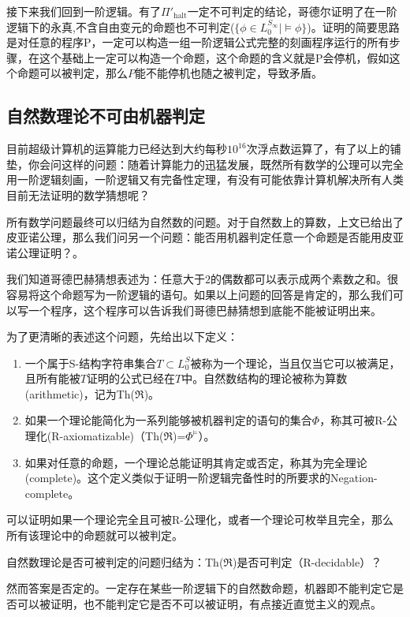      接下来我们回到一阶逻辑。有了$\Pi'_{\text{halt}}$一定不可判定的结论，哥德尔证明了在一阶逻辑下的永真,不含自由变元的命题也不可判定($\{\phi \in L_0^{S_\infty}  | \models \phi \}$)。证明的简要思路是对任意的程序P，一定可以构造一组一阶逻辑公式完整的刻画程序运行的所有步骤，在这个基础上一定可以构造一个命题，这个命题的含义就是P会停机，假如这个命题可以被判定，那么$P$能不能停机也随之被判定，导致矛盾。

\subsection{自然数理论不可由机器判定}

     目前超级计算机的运算能力已经达到大约每秒$10^{16}$次浮点数运算了，有了以上的铺垫，你会问这样的问题：随着计算能力的迅猛发展，既然所有数学的公理可以完全用一阶逻辑刻画，一阶逻辑又有完备性定理，有没有可能依靠计算机解决所有人类目前无法证明的数学猜想呢？

     所有数学问题最终可以归结为自然数的问题。对于自然数上的算数，上文已给出了皮亚诺公理，那么我们问另一个问题：能否用机器判定任意一个命题是否能用皮亚诺公理证明？。


		 我们知道哥德巴赫猜想表述为：任意大于$2$的偶数都可以表示成两个素数之和。很容易将这个命题写为一阶逻辑的语句。如果以上问题的回答是肯定的，那么我们可以写一个程序，这个程序可以告诉我们哥德巴赫猜想到底能不能被证明出来。


		 为了更清晰的表述这个问题，先给出以下定义：
		 \begin{enumerate}
		 	   \item 一个属于S-结构字符串集合$T \subset L_0^{S}$被称为一个理论，当且仅当它可以被满足，且所有能被$T$证明的公式已经在$T$中。自然数结构的理论被称为算数(arithmetic)，记为Th($\Re$)。
				 \item 如果一个理论能简化为一系列能够被机器判定的语句的集合$\Phi$，称其可被R-公理化(R-axiomatizable)（Th($\Re$)=$\Phi^{\models}$）。
				 \item 如果对任意的命题，一个理论总能证明其肯定或否定，称其为完全理论(complete)。这个定义类似于证明一阶逻辑完备性时的所要求的Negation-complete。
		 \end{enumerate}

		 可以证明如果一个理论完全且可被R-公理化，或者一个理论可枚举且完全，那么所有该理论中的命题就可以被判定。

		 自然数理论是否可被判定的问题归结为：Th($\Re$)是否可判定（R-decidable）？

		 然而答案是否定的。一定存在某些一阶逻辑下的自然数命题，机器即不能判定它是否可以被证明，也不能判定它是否不可以被证明，有点接近直觉主义的观点。

